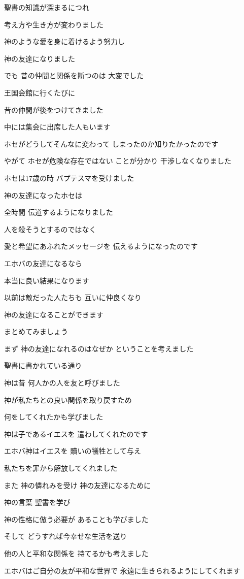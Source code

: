 \documentclass[twocolumn]{jsarticle}
\begin{document}
聖書の知識が深まるにつれ

考え方や生き方が変わりました

神のような愛を身に着けるよう努力し

神の友達になりました

でも 昔の仲間と関係を断つのは
大変でした

王国会館に行くたびに

昔の仲間が後をつけてきました

中には集会に出席した人もいます

ホセがどうしてそんなに変わって
しまったのか知りたかったのです

やがて ホセが危険な存在ではない
ことが分かり 干渉しなくなりました

ホセは17歳の時
バプテスマを受けました

神の友達になったホセは

全時間 伝道するようになりました

人を殺そうとするのではなく

愛と希望にあふれたメッセージを
伝えるようになったのです

エホバの友達になるなら

本当に良い結果になります

以前は敵だった人たちも
互いに仲良くなり

神の友達になることができます

まとめてみましょう

まず 神の友達になれるのはなぜか
ということを考えました

聖書に書かれている通り

神は昔 何人かの人を友と呼びました

神が私たちとの良い関係を取り戻すため

何をしてくれたかも学びました

神は子であるイエスを
遣わしてくれたのです

エホバ神はイエスを
贖いの犠牲として与え

私たちを罪から解放してくれました

また 神の憐れみを受け
神の友達になるために

神の言葉 聖書を学び

神の性格に倣う必要が
あることも学びました

そして どうすれば今幸せな生活を送り

他の人と平和な関係を
持てるかも考えました

エホバはご自分の友が平和な世界で
永遠に生きられるようにしてくれます
\end{document}
